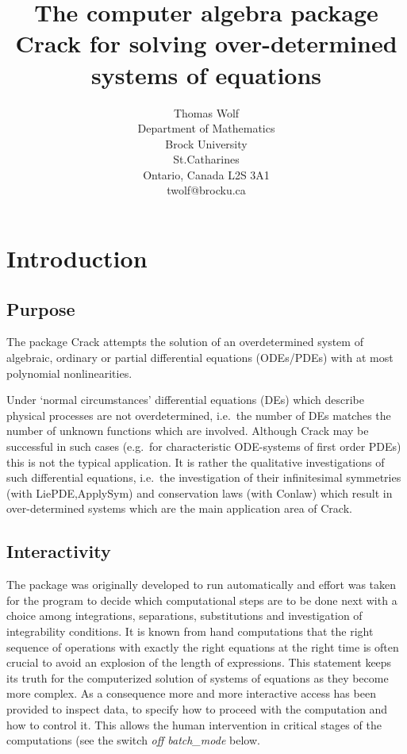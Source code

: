 \documentclass[12pt]{article}
\title{The computer algebra package {\sc Crack}
       for solving over-determined systems of equations}
\author{Thomas Wolf \\                        
        Department of Mathematics \\
        Brock University \\
        St.Catharines \\
        Ontario, Canada L2S 3A1 \\
        twolf@brocku.ca}
\begin{document}
\maketitle
\tableofcontents                                  

\section{Introduction}
\subsection{Purpose}
The package {\sc Crack} attempts the solution of an overdetermined
system of algebraic, ordinary or partial differential equations
(ODEs/PDEs) with at most polynomial nonlinearities.

Under `normal circumstances' differential equations (DEs) which
describe physical processes are not overdetermined, i.e.\ the number
of DEs matches the number of unknown functions which are involved.
Although {\sc Crack} may be successful in such cases (e.g.\ for
characteristic ODE-systems of first order PDEs) this is not the
typical application. It is rather the qualitative investigations of
such differential equations, i.e.\ the investigation of their
infinitesimal symmetries (with {\sc LiePDE,ApplySym}) and conservation
laws (with {\sc Conlaw}) which result in over-determined systems which
are the main application area of {\sc Crack}.

\subsection{Interactivity}
The package was originally developed to run automatically and effort
was taken for the program to decide which computational steps are to
be done next with a choice among integrations, separations,
substitutions and investigation of integrability conditions. It is
known from hand computations that the right sequence of operations
with exactly the right equations at the right time is often crucial to
avoid an explosion of the length of expressions. This statement keeps
its truth for the computerized solution of systems of equations as
they become more complex. As a consequence more and more interactive
access has been provided to inspect data, to specify how to proceed
with the computation and how to control it. This allows the human
intervention in critical stages of the computations (see the switch
{\em off batch\_mode} below.
\end{document}
